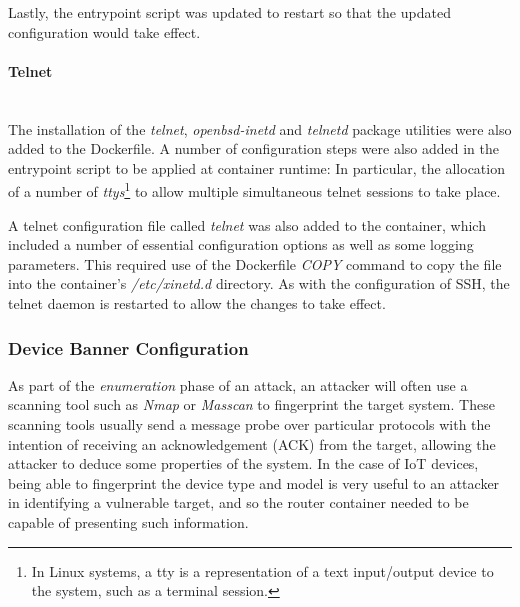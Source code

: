 Lastly, the entrypoint script was updated to restart so that the updated configuration would take effect.

\paragraph{Telnet}\mbox{}\\
The installation of the \textit{telnet}, \textit{openbsd-inetd } and \textit{telnetd} package utilities were also added to the Dockerfile. A number of configuration steps were also added in the entrypoint script to be applied at container runtime: In particular, the allocation of a number of \textit{ttys}\footnote{In Linux systems, a tty is a representation of a text input/output device to the system, such as a terminal session.} to allow multiple simultaneous telnet sessions to take place. 

A telnet configuration file called \textit{telnet} was also added to the container, which included a number of essential configuration options as well as some logging parameters. This required use of the Dockerfile \textit{COPY} command to copy the file into the container's \textit{/etc/xinetd.d} directory. As with the configuration of SSH, the telnet daemon is restarted to allow the changes to take effect.

\subsubsection{Device Banner Configuration}
As part of the \textit{enumeration} phase of an attack, an attacker will often use a scanning tool such as \textit{Nmap} or \textit{Masscan} to fingerprint the target system. These scanning tools usually send a message probe over particular protocols with the intention of receiving an acknowledgement (ACK) from the target, allowing the attacker to deduce some properties of the system. In the case of IoT devices, being able to fingerprint the device type and model is very useful to an attacker in identifying a vulnerable target, and so the router container needed to be capable of presenting such information.

